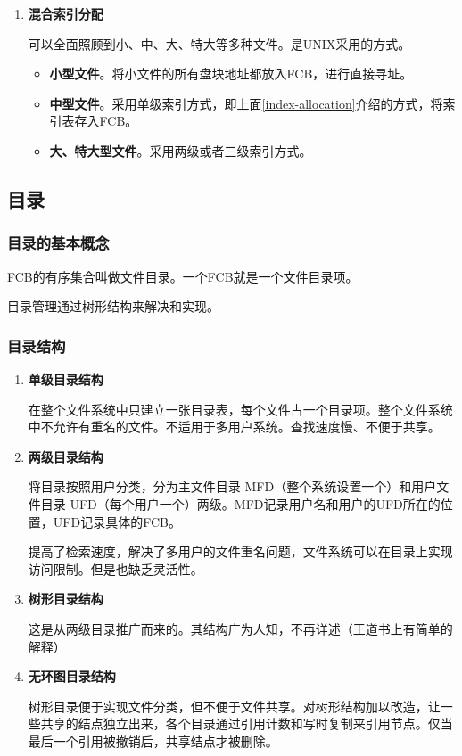 \documentclass[12pt, a4paper, oneside]{ctexart}
\begin{document}
\begin{enumerate}
  \item {\bf 混合索引分配}
  
  可以全面照顾到小、中、大、特大等多种文件。是UNIX采用的方式。
  \begin{itemize}
    \item {\bf 小型文件}。将小文件的所有盘块地址都放入FCB，进行直接寻址。
    \item {\bf 中型文件}。采用单级索引方式，即上面\ref{index-allocation}介绍的方式，将索引表存入FCB。
    \item {\bf 大、特大型文件}。采用两级或者三级索引方式。
  \end{itemize}
\end{enumerate}

\subsection{目录}

\subsubsection{目录的基本概念}

FCB的有序集合叫做文件目录。一个FCB就是一个文件目录项。

目录管理通过树形结构来解决和实现。

\subsubsection{目录结构}

\begin{enumerate}
  \item {\bf 单级目录结构}
  
  在整个文件系统中只建立一张目录表，每个文件占一个目录项。整个文件系统中不允许有重名的文件。不适用于多用户系统。查找速度慢、不便于共享。

  \item {\bf 两级目录结构}
  
  将目录按照用户分类，分为主文件目录 MFD（整个系统设置一个）和用户文件目录 UFD（每个用户一个）两级。MFD记录用户名和用户的UFD所在的位置，UFD记录具体的FCB。

  提高了检索速度，解决了多用户的文件重名问题，文件系统可以在目录上实现访问限制。但是也缺乏灵活性。

  \item {\bf 树形目录结构}
  
  这是从两级目录推广而来的。其结构广为人知，不再详述（王道书上有简单的解释）

  \item {\bf 无环图目录结构}
  
  树形目录便于实现文件分类，但不便于文件共享。对树形结构加以改造，让一些共享的结点独立出来，各个目录通过引用计数和写时复制来引用节点。仅当最后一个引用被撤销后，共享结点才被删除。
\end{enumerate}
\end{document}
